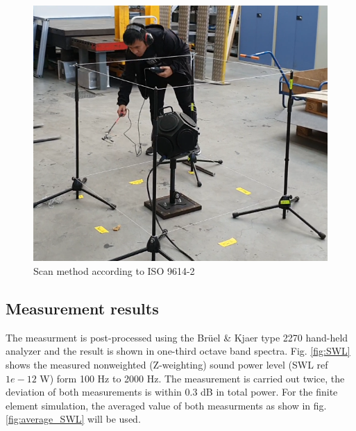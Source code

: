 \begin{figure}[H]
\begin{center}
\includegraphics[width=12cm]{fig/Sound_power_measurement_2.png}
\caption{Scan method according to ISO 9614-2 \cite{din19969614}}
\label{fig:scanningmethod}
\end{center}
\end{figure}

\subsection*{Measurement results}

The measurment is post-processed using the Brüel \& Kjaer type 2270 hand-held analyzer and the result is shown in one-third octave band spectra. Fig. \ref{fig:SWL} shows the measured nonweighted (Z-weighting) sound power level (SWL ref $1e-12$ W) form 100 Hz to 2000 Hz. The measurement is carried out twice, the deviation of both measurements is within 0.3 dB in total power. For the finite element simulation, the averaged value of both measurments as show in fig. \ref{fig:average_SWL} will be used.


